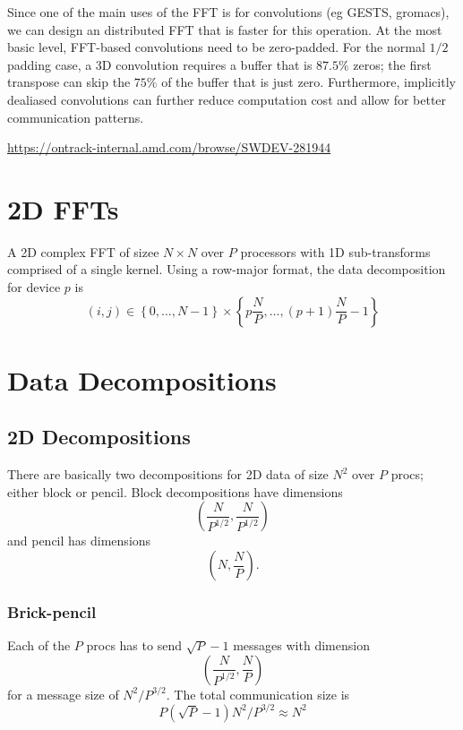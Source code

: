 \documentclass[12pt]{article}
\renewcommand{\(}{\left(}
\renewcommand{\)}{\right)}
\begin{document}
Since one of the main uses of the FFT is for convolutions (eg GESTS,
gromacs), we can design an distributed FFT that is faster for this
operation.  At the most basic level, FFT-based convolutions need to be
zero-padded.  For the normal $1/2$ padding case, a 3D convolution
requires a buffer that is $87.5\%$ zeros; the first transpose can skip
the $75\%$ of the buffer that is just zero.  Furthermore, implicitly
dealiased convolutions can further reduce computation cost and allow
for better communication patterns.


\url{https://ontrack-internal.amd.com/browse/SWDEV-281944}

\section{2D FFTs}

A 2D complex FFT of sizee $N\times{}N$ over $P$ processors with 1D
sub-transforms comprised of a single kernel. Using a row-major format,
the data decomposition for device $p$ is
\begin{dmath}
  (i,j) \in \left\{0,\dots,N-1 \right\}
  \times \left\{p\frac{N}{P},\dots{},(p+1)\frac{N}{P}-1\right\}
\end{dmath}


\section{Data Decompositions}
\label{section_data_decomp}


\subsection{2D Decompositions}

There are basically two decompositions for 2D data of size $N^2$ over
$P$ procs; either block or pencil.  Block decompositions have
dimensions
\begin{dmath}
  \label{brick2d}
  \left(\frac{N}{P^{1/2}}, \frac{N}{P^{1/2}} \right)
\end{dmath}
and pencil has dimensions
\begin{dmath}
  \label{pencil2d}
  \left(N, \frac{N}{P} \right).
\end{dmath}

\subsubsection{Brick-pencil}
Each of the $P$ procs has to send $\sqrt{P}-1$ messages with dimension
\begin{dmath}
  \left(\frac{N}{P^{1/2}}, \frac{N}{P} \right)
\end{dmath}
for a message size of $N^2/P^{3/2}$.  The total communication size is
\begin{dmath}
  P \(\sqrt{P}-1\) N^2/P^{3/2} \approx N^2
\end{dmath}
\end{document}

